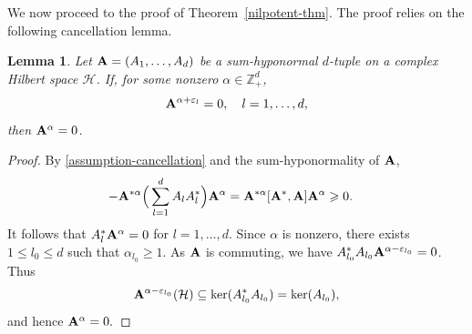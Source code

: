 \documentclass[10pt, a4paper, oneside, reqno]{amsproc}
\numberwithin{equation}{section}
\newtheorem{lemma}[theorem]{Lemma}
\theoremstyle{remark}
\theoremstyle{definition}
\newcommand*{\Ge}{\geqslant}
\newcommand*{\Le}{\leqslant}
\begin{document}
We now proceed to the proof of Theorem~\ref{nilpotent-thm}. The proof relies on the following cancellation lemma.
\begin{lemma} \label{prod-lem}
Let ${\bf A}=(A_1, \ldots, A_d)$ be a sum-hyponormal $d$-tuple on a complex Hilbert space $\mathcal H$. If, for some nonzero $\alpha \in \mathbb Z^d_+$, 
\begin{equation}
\label{assumption-cancellation}
{\bf A}^{\alpha + \varepsilon_l}=0, \quad l=1, \ldots, d,
\end{equation}
then ${\bf A}^\alpha=0$.
\end{lemma}
\begin{proof} 
By \eqref{assumption-cancellation} and the sum-hyponormality of ${\bf A}$, 
\begin{align*} -{\bf A}^{*\alpha}\Big(\sum_{l=1}^d A_l A^*_l \Big){\bf A}^{\alpha} &= {\bf A}^{*\alpha}[{\bf A}^*, {\bf A}]{\bf A}^{\alpha} \Ge 0.
\end{align*}
It follows that 
$A^*_l {\bf A}^{\alpha} = 0$ for $l =1, \ldots, d$.
Since $\alpha$ is nonzero, there exists $1 \Le l_0 \Le d$ such that $\alpha_{l_0} \Ge 1$. As ${\bf A}$ is commuting, we have $A^*_{l_0}A_{l_0}{\bf A}^{\alpha - \varepsilon_{l_0}}=0$.
Thus $${\bf A}^{\alpha - \varepsilon_{l_0}}(\mathcal H) \subseteq \ker(A^*_{l_0}A_{l_0})=\ker(A_{l_0}),$$ and hence ${\bf A}^{\alpha}=0.$
\end{proof}
\end{document}
